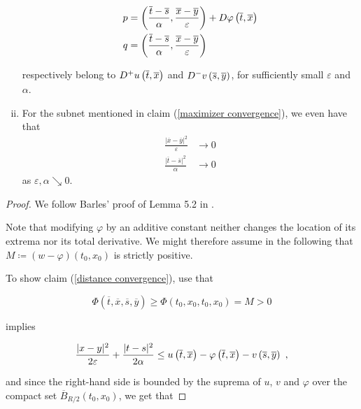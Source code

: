 \begin{lemma}
\begin{enumerate}[(i)]
		 		\begin{align*}
		 			p &= \left( \frac{\overline{t} - \overline{s}}{\alpha}, \frac{\overline{x} - \overline{y}}{\varepsilon} \right) + D\varphi\left(\overline{t}, \overline{x}\right) \\
		 			q &= \left( \frac{\overline{t} - \overline{s}}{\alpha}, \frac{\overline{x} - \overline{y}}{\varepsilon} \right)
		 		\end{align*}
		 		
		 		respectively belong to $ D^{+}u\left(\overline{t}, \overline{x}\right) $ and $ D^{-}v\left(\overline{s}, \overline{y}\right) $, for sufficiently small $ \varepsilon $ and $ \alpha $.
		 		
		 		\item
		 		\label{fast convergence}
		 		For the subnet mentioned in claim (\ref{maximizer convergence}), we even have that
		 		\begin{align*}
		 			\frac{\lvert \overline{x} - \overline{y} \rvert^2}{\varepsilon} &\to 0 \\
		 			\frac{\lvert \overline{t} - \overline{s} \rvert^2}{\alpha} &\to 0 
		 		\end{align*} 
		 		as $ \varepsilon, \alpha \searrow 0 $.
		 	\end{enumerate}
	 	
	 	\begin{proof}
	 		We follow Barles' proof of Lemma 5.2 in \cite[p.~69]{barles}.
	 		
	 		Note that modifying $ \varphi $ by an additive constant neither changes the location of its extrema nor its total derivative. We might therefore assume in the following that $ M \coloneqq (w - \varphi)(t_0, x_0)  $ is strictly positive.
	 		
	 		To show claim (\ref{distance convergence}), use that
	 		
	 		\begin{equation}
	 			\label{larger maximum}
	 			\Phi(\overline{t}, \overline{x}, \overline{s}, \overline{y}) \geq \Phi(t_0, x_0, t_0, x_0) = M > 0
	 		\end{equation}
	 		
	 		implies
	 		
	 		\begin{equation*}
	 			\frac{\lvert x - y \rvert^2 }{2 \varepsilon} + \frac{\lvert t - s \rvert^2}{2 \alpha} \leq u\left(\overline{t}, \overline{x}\right) - \varphi\left(\overline{t}, \overline{x}\right) - v\left(\overline{s}, \overline{y}\right) \ ,
	 		\end{equation*}
	 		
	 		and since the right-hand side is bounded by the suprema of $ u $, $ v $ and $ \varphi $ over the compact set $ \overline{B}_{R / 2}(t_0, x_0) $, we get that
	 		

\end{proof}
\end{lemma}
